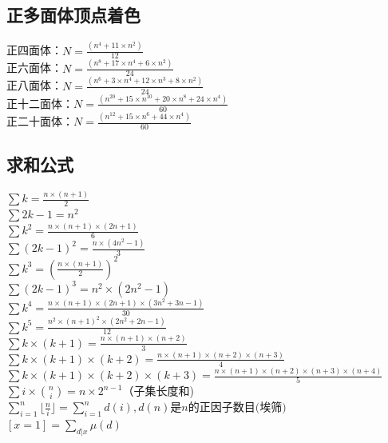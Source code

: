 	\subsection{正多面体顶点着色}
	正四面体：$N = \frac{(n^{4}+11\times n^{2})}{12}$\\
	正六面体：$N = \frac{(n^{8}+17\times n^{4}+6\times n^{2})}{24}$\\
	正八面体：$N = \frac{(n^{6}+3\times n^{4}+12\times n^{3}+8\times n^{2})}{24}$\\
	正十二面体：$N = \frac{(n^{20}+15\times n^{10}+20\times n^{8}+24\times n^{4})}{60}$\\
	正二十面体：$N = \frac{(n^{12}+15\times n^{6}+44\times n^{4})}{60}$\\
	
	\subsection{求和公式}
	$\sum{k} = \frac{n\times (n+1)}{2}$\\
	$\sum{2k-1} = n^{2}$\\
	$\sum{k^{2}} = \frac{n\times (n+1)\times (2n+1)}{6}$\\
	$\sum{(2k-1)^{2}} = \frac{n\times (4n^{2}-1)}{3}$\\
	$\sum{k^{3}} = (\frac{n\times (n+1)}{2})^{2}$\\
	$\sum{(2k-1)^{3}} = n^{2}\times (2n^{2}-1)$\\
	$\sum{k^{4}} = \frac{n\times (n+1)\times (2n+1)\times (3n^{2}+3n-1)}{30}$\\
	$\sum{k^{5}} = \frac{n^{2}\times (n+1)^{2}\times (2n^{2}+2n-1)}{12}$\\
	$\sum{k\times (k+1)} = \frac{n\times (n+1)\times (n+2)}{3}$\\
	$\sum{k\times (k+1)\times (k+2)} = \frac{n\times (n+1)\times (n+2)\times (n+3)}{4}$\\
	$\sum{k\times (k+1)\times (k+2)\times (k+3)} = \frac{n\times (n+1)\times (n+2)\times (n+3)\times (n+4)}{5}$\\
	$\sum{i\times \binom{n}{i}} = n \times 2^{n - 1}$（子集长度和)\\
	$\sum_{i=1}^{n} \lfloor{\frac{n}{i}}\rfloor = \sum_{i=1}^{n} d(i), d(n)\text{是}n\text{的正因子数目(埃筛)}$\\
	$[x=1] = \sum_{d|x} \mu (d)$
